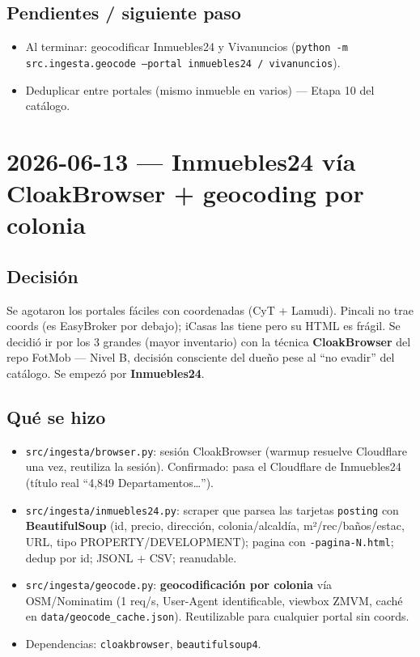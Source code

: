 \documentclass[11pt]{article}
\newcommand{\codigo}[1]{\texttt{#1}}
\newcommand{\pend}{\item[\textcolor{acento}{$\square$}]}
\begin{document}
\subsection*{Pendientes / siguiente paso}
\begin{itemize}
  \pend Al terminar: geocodificar Inmuebles24 y Vivanuncios
        (\codigo{python -m src.ingesta.geocode --portal inmuebles24 / vivanuncios}).
  \pend Deduplicar entre portales (mismo inmueble en varios) — Etapa 10 del catálogo.
\end{itemize}

\section*{2026-06-13 — Inmuebles24 vía CloakBrowser + geocoding por colonia}

\subsection*{Decisión}
Se agotaron los portales fáciles con coordenadas (CyT + Lamudi). Pincali no trae
coords (es EasyBroker por debajo); iCasas las tiene pero su HTML es frágil. Se
decidió ir por los 3 grandes (mayor inventario) con la técnica \textbf{CloakBrowser}
del repo FotMob — Nivel B, decisión consciente del dueño pese al ``no evadir'' del
catálogo. Se empezó por \textbf{Inmuebles24}.

\subsection*{Qué se hizo}
\begin{itemize}
  \item \codigo{src/ingesta/browser.py}: sesión CloakBrowser (warmup resuelve
        Cloudflare una vez, reutiliza la sesión). Confirmado: pasa el Cloudflare
        de Inmuebles24 (título real ``4,849 Departamentos…'').
  \item \codigo{src/ingesta/inmuebles24.py}: scraper que parsea las tarjetas
        \codigo{posting} con \textbf{BeautifulSoup} (id, precio, dirección,
        colonia/alcaldía, m²/rec/baños/estac, URL, tipo PROPERTY/DEVELOPMENT);
        pagina con \codigo{-pagina-N.html}; dedup por id; JSONL + CSV; reanudable.
  \item \codigo{src/ingesta/geocode.py}: \textbf{geocodificación por colonia} vía
        OSM/Nominatim (1 req/s, User-Agent identificable, viewbox ZMVM, caché en
        \codigo{data/geocode\_cache.json}). Reutilizable para cualquier portal sin
        coords.
  \item Dependencias: \codigo{cloakbrowser}, \codigo{beautifulsoup4}.
\end{itemize}
\end{document}
